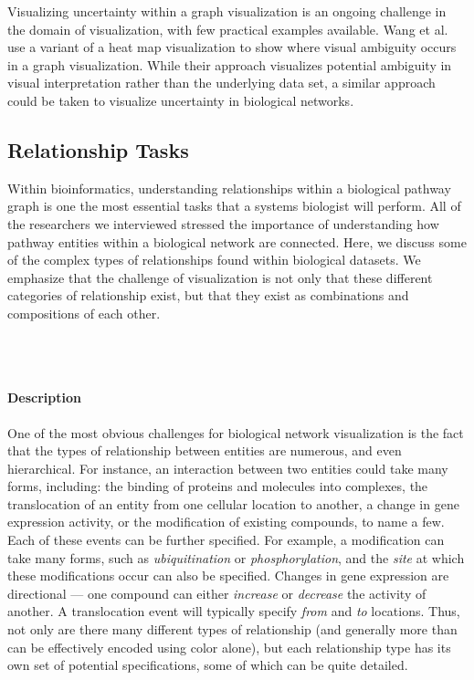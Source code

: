 \documentclass[twocolumn]{bmcart}%
\begin{document}
Visualizing uncertainty within a graph visualization is an ongoing challenge in the domain of visualization, with few practical examples available.
Wang et al.~\cite{wang2016ambiguityvis} use a variant of a heat map visualization to show where visual ambiguity occurs in a graph visualization.
While their approach visualizes potential ambiguity in visual interpretation rather than the underlying data set, a similar approach could be taken to visualize uncertainty in biological networks.

\subsection*{Relationship Tasks}

Within bioinformatics,  understanding relationships within a biological pathway graph is one the most essential tasks that a systems biologist will perform.
All of the researchers we interviewed stressed the importance of understanding how pathway entities within a biological network are connected.
Here, we discuss some of the complex types of relationships found within biological datasets.
We emphasize that the challenge of visualization is not only that these different categories of relationship exist, but that they exist as combinations and compositions of each other.

\ \\ \


\paragraph*{Description}

One of the most obvious challenges for biological network visualization is the fact that the types of relationship between entities are numerous, and even hierarchical.
For instance, an interaction between two entities could take many forms, including: the binding of proteins and molecules into complexes, the translocation of an entity from one cellular location to another, a change in gene expression activity, or the modification of existing compounds, to name a few.
Each of these events can be further specified.
For example, a modification can take many forms, such as \textit{ubiquitination} or \textit{phosphorylation}, and the \textit{site} at which these modifications occur can also be specified.
Changes in gene expression are directional --- one compound can either \textit{increase} or \textit{decrease} the activity of another.
A translocation event will typically specify \textit{from} and \textit{to} locations.
Thus, not only are there many different types of relationship (and generally more than can be effectively encoded using color alone), but each relationship type has its own set of potential specifications, some of which can be quite detailed.
\end{document}
